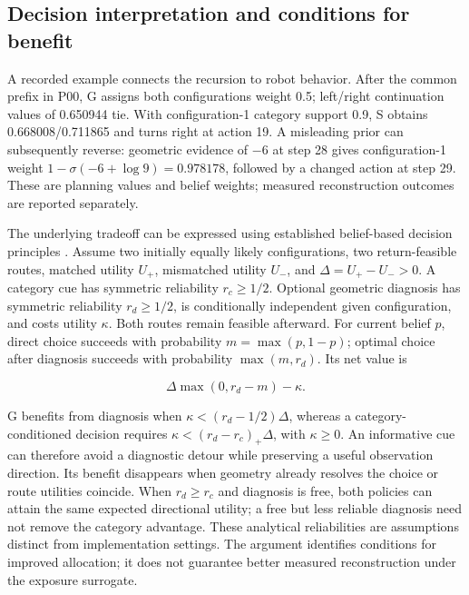 \hypertarget{decision-interpretation-and-conditions-for-benefit}{%
\subsection{Decision interpretation and conditions for benefit}\label{decision-interpretation-and-conditions-for-benefit}}

A recorded example connects the recursion to robot behavior. After the common prefix in P00, G assigns both configurations weight 0.5; left/right continuation values of 0.650944 tie. With configuration-1 category support 0.9, S obtains 0.668008/0.711865 and turns right at action 19. A misleading prior can subsequently reverse: geometric evidence of \(-6\) at step 28 gives configuration-1 weight \(1-\sigma(-6+\log9)=0.978178\), followed by a changed action at step 29. These are planning values and belief weights; measured reconstruction outcomes are reported separately.

The underlying tradeoff can be expressed using established belief-based decision principles \cite{ref12,ref13}. Assume two initially equally likely configurations, two return-feasible routes, matched utility \(U_+\), mismatched utility \(U_-\), and \(\Delta=U_+-U_->0\). A category cue has symmetric reliability \(r_c\ge1/2\). Optional geometric diagnosis has symmetric reliability \(r_d\ge1/2\), is conditionally independent given configuration, and costs utility \(\kappa\). Both routes remain feasible afterward. For current belief \(p\), direct choice succeeds with probability \(m=\max(p,1-p)\); optimal choice after diagnosis succeeds with probability \(\max(m,r_d)\). Its net value is

\[
\Delta\max(0,r_d-m)-\kappa.
\]

G benefits from diagnosis when \(\kappa<(r_d-1/2)\Delta\), whereas a category-conditioned decision requires \(\kappa<(r_d-r_c)_+\Delta\), with \(\kappa\ge0\). An informative cue can therefore avoid a diagnostic detour while preserving a useful observation direction. Its benefit disappears when geometry already resolves the choice or route utilities coincide. When \(r_d\ge r_c\) and diagnosis is free, both policies can attain the same expected directional utility; a free but less reliable diagnosis need not remove the category advantage. These analytical reliabilities are assumptions distinct from implementation settings. The argument identifies conditions for improved allocation; it does not guarantee better measured reconstruction under the exposure surrogate.

